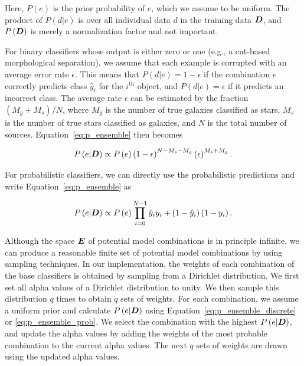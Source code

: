 \documentclass[useAMS,usenatbib]{mn2e}
\newcommand{\eg}{{e.g., }}
\begin{document}
\noindent
Here, $P\left(e \right)$ is the prior probability of $e$,
which we assume to be uniform.
The product of $P\left(d | e\right)$ is
over all individual data $d$ in the training data $\bmath{D}$,
and $P\left(\bmath{D}\right)$ is merely a normalization factor
and not important.

For binary classifiers whose output is either zero or one
(\eg a cut-based morphological separation),
we assume that each example is corrupted with
an average error rate $\epsilon$.
This means that
$P\left(d|e\right) = 1-\epsilon$ if the combination $e$
correctly predicts class $\hat{y}_i$ for the $i^{\text{th}}$ object,
and $P\left(d|e\right) = \epsilon$ if it predicts an incorrect class.
The average rate $\epsilon$ can be estimated by
the fraction $\left(M_g + M_s\right) / N$,
where $M_g$ is the number of true galaxies classified as stars,
$M_s$ is the number of true stars classified as galaxies,
and $N$ is the total number of sources.
Equation~\ref{eq:p_ensemble} then becomes

\begin{equation} \label{eq:p_ensemble_discrete}
  P \left( e | \bmath{D} \right) \propto 
  P \left( e \right) \left(1 - \epsilon \right)^{N - M_s - M_g}
  \left( \epsilon \right)^{M_s + M_g}.
\end{equation}

\noindent
For probabilistic classifiers,
we can directly use the probabilistic predictions
and write Equation~\ref{eq:p_ensemble} as

\begin{equation} \label{eq:p_ensemble_prob}
  P \left( e | \bmath{D} \right) \propto 
  P \left( e \right) \prod_{i=0}^{N-1}
  \hat{y}_i y_i + 
  \left(1 - \hat{y}_i\right) \left(1 - y_i\right).
\end{equation}


Although the space $\bmath{E}$ of potential model combinations
is in principle infinite,
we can produce a reasonable finite set
of potential model combinations by using sampling techniques.
In our implementation,
the weights of each combination of the base classifiers
is obtained by sampling from a Dirichlet distribution.
We first set all alpha values of a Dirichlet distribution to unity.
We then sample this distribution $q$ times
to obtain $q$ sets of weights.
For each combination,
we assume a uniform prior and
calculate $P\left(e|\bmath{D}\right)$ using
Equation~\ref{eq:p_ensemble_discrete} or \ref{eq:p_ensemble_prob}.
We select the combination with the highest $P\left(e|\bmath{D}\right)$,
and update the alpha values by
adding the weights of the most probable combination
to the current alpha values.
The next $q$ sets of weights are drawn
using the updated alpha values.
\end{document}
